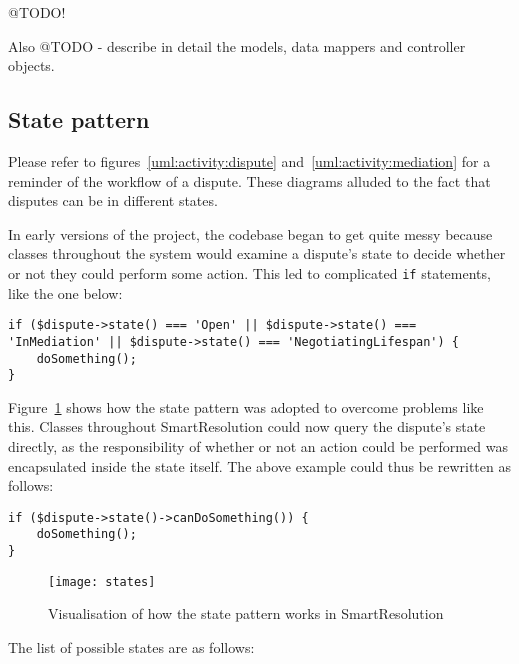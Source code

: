 @TODO!

Also @TODO - describe in detail the models, data mappers and controller objects.

\subsection{State pattern}

Please refer to figures~\ref{uml:activity:dispute} and~\ref{uml:activity:mediation} for a reminder of the workflow of a dispute. These diagrams alluded to the fact that disputes can be in different states.

In early versions of the project, the codebase began to get quite messy because classes throughout the system would examine a dispute's state to decide whether or not they could perform some action. This led to complicated \lstinline{if} statements, like the one below:

\begin{lstlisting}
if ($dispute->state() === 'Open' || $dispute->state() === 'InMediation' || $dispute->state() === 'NegotiatingLifespan') {
    doSomething();
}
\end{lstlisting}

Figure~\ref{uml:states} shows how the state pattern was adopted to overcome problems like this. Classes throughout SmartResolution could now query the dispute's state directly, as the responsibility of whether or not an action could be performed was encapsulated inside the state itself. The above example could thus be rewritten as follows:

\begin{lstlisting}
if ($dispute->state()->canDoSomething()) {
    doSomething();
}
\end{lstlisting}

\begin{figure}[h!]
  \centering
    \ifimages
    \texttt{[image: states]}
    \fi
  \caption{Visualisation of how the state pattern works in SmartResolution}
  \label{uml:states}
\end{figure}

The list of possible states are as follows:

